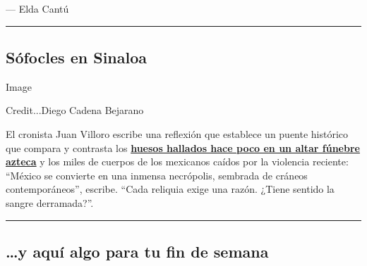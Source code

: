 --- Elda Cantú

\begin{center}\rule{0.5\linewidth}{\linethickness}\end{center}

\hypertarget{suxf3focles-en-sinaloa}{%
\subsection{Sófocles en Sinaloa}\label{suxf3focles-en-sinaloa}}

Image

Credit...Diego Cadena Bejarano

El cronista Juan Villoro escribe una reflexión que establece un puente
histórico que compara y contrasta los
\textbf{\href{https://www.nytimes3xbfgragh.onion/es/2020/07/30/espanol/opinion/aztecas-violencia-narco-amlo.html}{huesos
hallados hace poco en un altar fúnebre azteca}} y los miles de cuerpos
de los mexicanos caídos por la violencia reciente: ``México se convierte
en una inmensa necrópolis, sembrada de cráneos contemporáneos'',
escribe. ``Cada reliquia exige una razón. ¿Tiene sentido la sangre
derramada?''.

\begin{center}\rule{0.5\linewidth}{\linethickness}\end{center}

\hypertarget{y-aquuxed-algo-para-tu-fin-de-semana}{%
\subsection{\ldots{}y aquí algo para tu fin de
semana}\label{y-aquuxed-algo-para-tu-fin-de-semana}}

